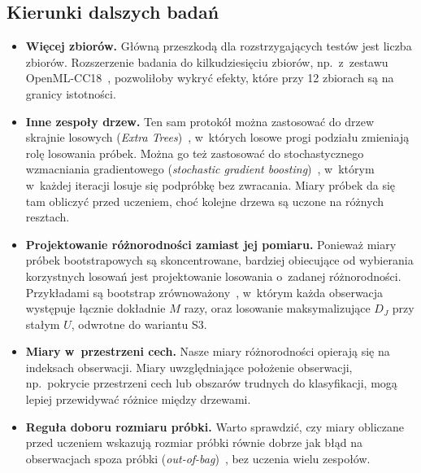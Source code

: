 \subsection{Kierunki dalszych badań}

\begin{itemize}
  \item \textbf{Więcej zbiorów.} Główną przeszkodą dla rozstrzygających testów jest liczba zbiorów. Rozszerzenie badania do kilkudziesięciu zbiorów, np.\ z~zestawu OpenML-CC18~\cite{bischl2021}, pozwoliłoby wykryć efekty, które przy 12 zbiorach są na granicy istotności.
  \item \textbf{Inne zespoły drzew.} Ten sam protokół można zastosować do drzew skrajnie losowych (\emph{Extra Trees})~\cite{geurts2006}, w~których losowe progi podziału zmieniają rolę losowania próbek. Można go też zastosować do stochastycznego wzmacniania gradientowego (\emph{stochastic gradient boosting})~\cite{friedman2002}, w~którym w~każdej iteracji losuje się podpróbkę bez zwracania. Miary próbek da się tam obliczyć przed uczeniem, choć kolejne drzewa są uczone na różnych resztach.
  \item \textbf{Projektowanie różnorodności zamiast jej pomiaru.} Ponieważ miary próbek bootstrapowych są skoncentrowane, bardziej obiecujące od wybierania korzystnych losowań jest projektowanie losowania o~zadanej różnorodności. Przykładami są bootstrap zrównoważony~\cite{davison1986}, w~którym każda obserwacja występuje łącznie dokładnie $M$ razy, oraz losowanie maksymalizujące $D_J$ przy stałym $U$, odwrotne do wariantu S3.
  \item \textbf{Miary w~przestrzeni cech.} Nasze miary różnorodności opierają się na indeksach obserwacji. Miary uwzględniające położenie obserwacji, np.\ pokrycie przestrzeni cech lub obszarów trudnych do klasyfikacji, mogą lepiej przewidywać różnice między drzewami.
  \item \textbf{Reguła doboru rozmiaru próbki.} Warto sprawdzić, czy miary obliczane przed uczeniem wskazują rozmiar próbki równie dobrze jak błąd na obserwacjach spoza próbki (\emph{out-of-bag})~\cite{martinez2010}, bez uczenia wielu zespołów.
\end{itemize}

